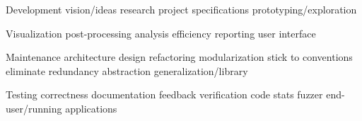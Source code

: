

\textsf{Development}
vision/ideas
research
project specifications
prototyping/exploration

\textsf{Visualization}
post-processing
analysis
efficiency
reporting
user interface

\textsf{Maintenance}
architecture
design
refactoring
modularization
stick to conventions
eliminate redundancy
abstraction
generalization/library

\textsf{Testing}
correctness
documentation
feedback
verification
code stats
fuzzer
end-user/running applications


